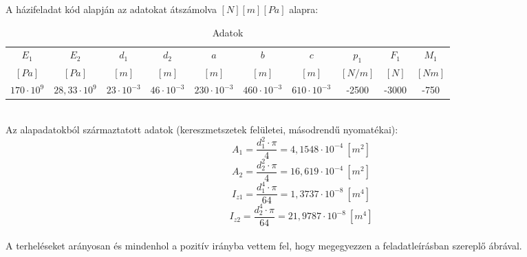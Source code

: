 \documentclass{article}
\begin{document}
		A házifeladat kód alapján az adatokat átszámolva $[N][m][Pa]$ alapra:
		\def\arraystretch{1.2}%
		\begin{table}[h!]
			\begin{center}
				\caption{Adatok}
				\label{tab:table1}
				\begin{tabular}{c|c|c|c|c|c|c|c|c|c} %
					$E_1$  	&	$E_2$	& $d_{1}$ 	& $d_{2}$ & $a$ & $b$ & $c$ & $p_{1}$ & $F_{1}$ & $M_{1}$ \\
					$[Pa]$ 	&	$[Pa]$	& $[m]$ 	& $[m]$ & $[m]$ & $[m]$ & $[m]$ & $[N/m]$ & $[N]$ & $[Nm]$\\
					\hline
					$170\cdot10^9$ & $28,33\cdot10^9$ & $23\cdot10^{-3}$ & $46\cdot10^{-3}$ & $230\cdot10^{-3}$ & $460\cdot10^{-3}$ & $610\cdot10^{-3}$ & -2500 & -3000 & -750\\
				\end{tabular}
			\end{center}
		\end{table}\\[10pt]
		\def\arraystretch{1}%
		Az alapadatokból származtatott adatok (kereszmetszetek felületei, másodrendű nyomatékai):	
		\begin{equation}
		A_1=\frac{d_1^{2}\cdot\pi}{4}=4,1548 \cdot 10^{-4}~[m^{2}]
		\end{equation}
		\begin{equation}
		A_2=\frac{d_2^{2}\cdot\pi}{4}=16,619 \cdot 10^{-4}~[m^{2}]
		\end{equation}
		\begin{equation}
		I_{z1}=\frac{d_1^4\cdot\pi}{64}=1,3737 \cdot 10^{-8}~[m^{4}]
		\end{equation}
		\begin{equation}
		I_{z2}=\frac{d_2^4\cdot\pi}{64}=21,9787 \cdot 10^{-8}~[m^{4}]
		\end{equation}\\[10pt]
		A terheléseket arányosan és mindenhol a pozitív irányba vettem fel, hogy megegyezzen a feladatleírásban szereplő ábrával.
	
	\newcommand{\degy}{8}
	\newcommand{\dketto}{16}
	
\end{document}
